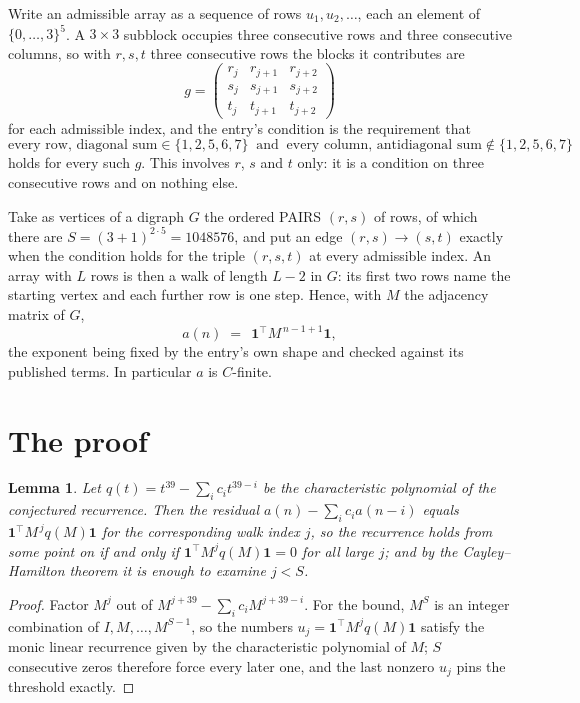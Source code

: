 \documentclass[11pt,a4paper]{article}
\theoremstyle{plain}
\newtheorem{lemma}[theorem]{Lemma}
\theoremstyle{definition}
\begin{document}
Write an admissible array as a sequence of rows $u_1,u_2,\dots$, each an element of
$\{0,\dots,3\}^{5}$. A $3\times3$ subblock occupies three consecutive rows and
three consecutive columns, so with $r,s,t$ three consecutive rows the blocks it
contributes are
\[
g=\begin{pmatrix}r_j&r_{j+1}&r_{j+2}\\ s_j&s_{j+1}&s_{j+2}\\ t_j&t_{j+1}&t_{j+2}\end{pmatrix}
\]
for each admissible index, and the entry's condition is the requirement that
\[
\text{every row, diagonal sum} \in \{1,2,5,6,7\}\ \text{ and }\ \text{every column, antidiagonal sum} \notin \{1,2,5,6,7\}
\]
holds for every such $g$. This involves $r$, $s$ and $t$ only: it is a condition on
three consecutive rows and on nothing else.

Take as vertices of a digraph $G$ the ordered PAIRS $(r,s)$ of rows, of which there are
$S=(3+1)^{2\cdot5}=1048576$, and put an edge $(r,s)\to(s,t)$ exactly when the condition
holds for the triple $(r,s,t)$ at every admissible index. An array with $L$ rows is then a
walk of length $L-2$ in $G$: its first two rows name the starting vertex and each further
row is one step. Hence, with $M$ the adjacency matrix of $G$,
\[
a(n)\;=\;\,\mathbf{1}^{\!\top}M^{\,n-1+1}\mathbf{1},
\]
the exponent being fixed by the entry's own shape and checked against its published terms.
In particular $a$ is $C$-finite.

\section{The proof}

\begin{lemma}\label{lem:crit}
Let $q(t)=t^{39}-\sum_i c_it^{39-i}$ be the characteristic polynomial of the
conjectured recurrence. Then the residual $a(n)-\sum_ic_ia(n-i)$ equals
$\mathbf{1}^{\!\top}M^{\,j}q(M)\mathbf{1}$ for the corresponding walk index
$j$, so the recurrence holds from some point on if and only if
$\mathbf{1}^{\!\top}M^{j}q(M)\mathbf{1}=0$ for all large $j$; and by the
Cayley--Hamilton theorem it is enough to examine $j<S$.
\end{lemma}

\begin{proof}
Factor $M^{j}$ out of $M^{j+39}-\sum_ic_iM^{j+39-i}$. For the bound, $M^{S}$
is an integer combination of $I,M,\dots,M^{S-1}$, so the numbers
$u_j=\mathbf{1}^{\!\top}M^{j}q(M)\mathbf{1}$ satisfy the monic linear recurrence given by
the characteristic polynomial of $M$; $S$ consecutive zeros therefore force every later one,
and the last nonzero $u_j$ pins the threshold exactly.
\end{proof}
\end{document}
